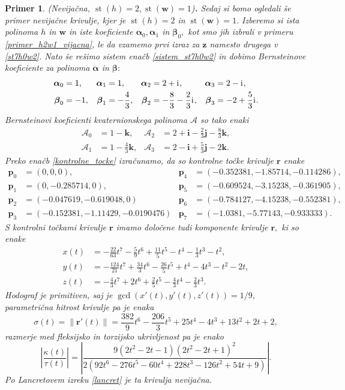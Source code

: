 \documentclass[12pt,a4paper,twoside]{article}
\newcommand{\iu}{\mathrm{i}\mkern1mu} %
\theoremstyle{definition} %
\theoremstyle{plain} %
\theoremstyle{primerstyle}
\newtheorem{primer}[definicija]{Primer}
\numberwithin{equation}{section}  %
\newcommand{\pV}{\mathbf{p}}
\newcommand{\rV}{\mathbf{r}}
\newcommand{\iV}{\mathbf{i}}
\newcommand{\jV}{\mathbf{j}}
\newcommand{\kV}{\mathbf{k}}
\newcommand{\wV}{\mathbf{w}}
\newcommand{\zV}{\mathbf{z}}
\newcommand{\AQ}{\mathcal{A}}
\newcommand{\balpha}{\boldsymbol \alpha}
\newcommand{\bbeta}{\boldsymbol \beta}
\DeclareMathOperator{\st}{st}
\begin{document}
\begin{primer}
	\label{primer_h2w1_nevijacna}
	\textnormal{ }(Nevijačna, $\st(h)=2,\st(\wV)=1$)\textbf{.}
	Sedaj si bomo ogledali še primer nevijačne krivulje, kjer je $\st(h)=2$ in $\st(\wV)=1.$ Izberemo si ista polinoma $h$ in $\wV$ in iste koeficiente $\balpha_0,\balpha_1$ in $\bbeta_0,$ kot smo jih izbrali v primeru \ref{primer_h2w1_vijacna}, le da vzamemo prvi izraz za $\zV$ namesto drugega v \eqref{st7h0w2}. Nato še rešimo sistem enačb \eqref{sistem_st7h0w2} in dobimo Bernsteinove koeficiente za polinoma $\balpha$ in $\bbeta:$
	\begin{align*}
	\balpha_0&=1,&\balpha_1&=1,&\balpha_2&=2+\iu,&\balpha_3&=2-\iu,\\
		\bbeta_0&=-1,&\bbeta_1&=-\frac{4}{3},&\bbeta_2&=-\frac{8}{3}-\frac{2}{3}\iu,&\bbeta_3&=-2+\frac{5}{3}\iu.
	\end{align*}
	Bernsteinovi koeficienti kvaternionskega polinoma $\AQ$ so tako enaki
	\begin{align*}
		\AQ_0&=1-\kV,&\AQ_2&=2+\iV-\frac{2}{3}\jV-\frac{8}{3}\kV,\\
		\AQ_1&=1-\frac{4}{3}\kV,&\AQ_3&=2-\iV+\frac{5}{3}\jV-2\kV.
	\end{align*}
	Preko enačb \eqref{kontrolne_tocke} izračunamo, da so kontrolne točke krivulje $\rV$ enake
	\begin{align*}
		\pV_0&=(0,0,0),&\pV_4&=(-0.352381, -1.85714, -0.114286),\\
		\pV_1&=(0, -0.285714, 0),&\pV_5&=(-0.609524, -3.15238, -0.361905),\\
		\pV_2&=(-0.047619, -0.619048, 0)&\pV_6&=(-0.784127, -4.15238, -0.552381),\\
		\pV_3&=(-0.152381, -1.11429, -0.0190476)&\pV_7&=(-1.0381, -5.77143, -0.933333).
	\end{align*}
	S kontrolni točkami krivulje $\rV$ imamo določene tudi komponente krivulje $\rV,$ ki so enake
	\begin{align*}
		x(t)&=-\frac{22}{63}t^7-\frac{5}{9}t^6+\frac{11}{5}t^5-t^4-\frac{1}{3}t^3-t^2,\\
		y(t)&=-\frac{124}{21}t^7+\frac{34}{3}t^6-\frac{26}{5}t^5+t^4-4t^3-t^2-2t,\\
		z(t)&=-\frac{4}{3}t^7+2t^6+\frac{2}{5}t^5-\frac{4}{3}t^4-\frac{2}{3}t^3.
	\end{align*}
	Hodograf je primitiven, saj je $\gcd(x'(t),y'(t),z'(t))=1/9,$ parametrična hitrost krivulje pa je enaka
	\begin{equation*}
		\sigma(t)=\lVert\rV'(t)\rVert=\frac{382}{9}t^6-\frac{206}{3}t^5+25t^4-4t^3+13t^2+2t+2,
	\end{equation*}
	razmerje med fleksijsko in torzijsko ukrivljenost pa je enako $$\left|\frac{\kappa(t)}{\tau(t)}\right|=\left|\frac{9(2t^2-2t-1)(2t^2-2t+1)^2}{2(92t^6-276t^5-60t^4+228t^3-126t^2+54t+9)}\right|.$$ Po Lancretovem izreku \ref{lancret} je ta krivulja nevijačna.
	

\end{primer}
\end{document}
